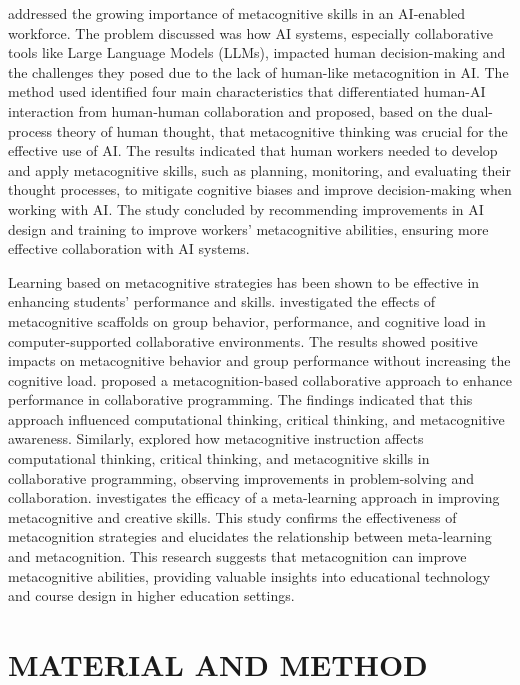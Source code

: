 \documentclass[a4paper,twoside]{article}
\begin{document}
\cite{Sidra24} addressed the growing importance of metacognitive skills in an
AI-enabled workforce. The problem discussed was how AI systems, especially
collaborative tools like Large Language Models (LLMs), impacted human
decision-making and the challenges they posed due to the lack of human-like
metacognition in AI. The method used identified four main characteristics that
differentiated human-AI interaction from human-human collaboration and proposed,
based on the dual-process theory of human thought, that metacognitive thinking
was crucial for the effective use of AI. The results indicated that human
workers needed to develop and apply metacognitive skills, such as planning,
monitoring, and evaluating their thought processes, to mitigate cognitive biases
and improve decision-making when working with AI. The study concluded by
recommending improvements in AI design and training to improve workers'
metacognitive abilities, ensuring more effective collaboration with AI systems.

Learning based on metacognitive strategies has been shown to be effective in
enhancing students’ performance and skills. \cite{Zheng19} investigated the
effects of metacognitive scaffolds on group behavior, performance, and cognitive
load in computer-supported collaborative environments. The results showed
positive impacts on metacognitive behavior and group performance without
increasing the cognitive load. \cite{LiWei23} proposed a metacognition-based
collaborative approach to enhance performance in collaborative programming. The
findings indicated that this approach influenced computational thinking,
critical thinking, and metacognitive awareness. Similarly, \cite{Wang23}
explored how metacognitive instruction affects computational thinking, critical
thinking, and metacognitive skills in collaborative programming, observing
improvements in problem-solving and collaboration. \cite{Khusnul24} investigates
the efficacy of a meta-learning approach in improving metacognitive and creative
skills. This study confirms the effectiveness of metacognition strategies and
elucidates the relationship between meta-learning and metacognition. This
research suggests that metacognition can improve metacognitive abilities,
providing valuable insights into educational technology and course design in
higher education settings.

\section{\uppercase{Material and Method}}
\end{document}
